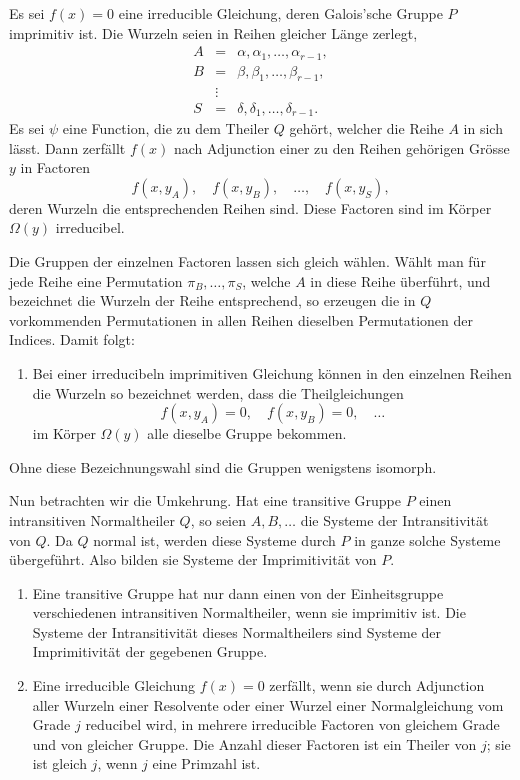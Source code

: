 \documentclass[11pt]{article}
\begin{document}
Es sei $f(x)=0$ eine irreducible Gleichung, deren Galois'sche Gruppe $P$ imprimitiv ist. Die Wurzeln seien in Reihen gleicher Länge zerlegt,
\[
\begin{array}{lll}
        A&=&\alpha,
\alpha_1,
\ldots,
\alpha_{r-1},\\
        B&=&\beta,
\beta_1,
\ldots,
\beta_{r-1},\\
        &\vdots&\\
        S&=&\delta,
\delta_1,
\ldots,
\delta_{r-1}.
\end{array}
\]
Es sei $\psi$ eine Function, die zu dem Theiler $Q$ gehört, welcher die Reihe $A$ in sich lässt. Dann zerfällt $f(x)$ nach Adjunction einer zu den Reihen gehörigen Grösse $y$ in Factoren
\[
        f(x,y_A),
\quad f(x,y_B),
\quad \ldots,
\quad f(x,y_S),
\]
deren Wurzeln die entsprechenden Reihen sind. Diese Factoren sind im Körper $\Omega(y)$ irreducibel.

Die Gruppen der einzelnen Factoren lassen sich gleich wählen. Wählt man für jede Reihe eine Permutation $\pi_B,
\ldots,
\pi_S$, welche $A$ in diese Reihe überführt, und bezeichnet die Wurzeln der Reihe entsprechend, so erzeugen die in $Q$ vorkommenden Permutationen in allen Reihen dieselben Permutationen der Indices. Damit folgt:
\begin{enumerate}[label=\arabic*.,leftmargin=2em]
\item Bei einer irreducibeln imprimitiven Gleichung können in den einzelnen Reihen die Wurzeln so bezeichnet werden, dass die Theilgleichungen
\[
        f(x,y_A)=0,
\quad f(x,y_B)=0,
\quad \ldots
\]
im Körper $\Omega(y)$ alle dieselbe Gruppe bekommen.
\end{enumerate}
Ohne diese Bezeichnungswahl sind die Gruppen wenigstens isomorph.

Nun betrachten wir die Umkehrung. Hat eine transitive Gruppe $P$ einen intransitiven Normaltheiler $Q$, so seien $A,B,\ldots$ die Systeme der Intransitivität von $Q$. Da $Q$ normal ist, werden diese Systeme durch $P$ in ganze solche Systeme übergeführt. Also bilden sie Systeme der Imprimitivität von $P$.

\begin{enumerate}[label=\arabic*.,leftmargin=2em,start=2]
\item Eine transitive Gruppe hat nur dann einen von der Einheitsgruppe verschiedenen intransitiven Normaltheiler, wenn sie imprimitiv ist. Die Systeme der Intransitivität dieses Normaltheilers sind Systeme der Imprimitivität der gegebenen Gruppe.
\item Eine irreducible Gleichung $f(x)=0$ zerfällt, wenn sie durch Adjunction aller Wurzeln einer Resolvente oder einer Wurzel einer Normalgleichung vom Grade $j$ reducibel wird, in mehrere irreducible Factoren von gleichem Grade und von gleicher Gruppe. Die Anzahl dieser Factoren ist ein Theiler von $j$; sie ist gleich $j$, wenn $j$ eine Primzahl ist.
\end{enumerate}
\end{document}
